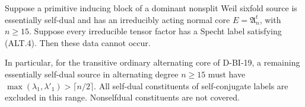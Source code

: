 \begin{theorem}
\label{HD-ALT-01c}
Suppose a primitive inducing block of a dominant nonsplit Weil
sixfold source is essentially self-dual and has an irreducibly
acting normal core $E=\mathfrak A_n^t$, with $n\ge15$.
Suppose every irreducible tensor factor has a Specht label
satisfying (ALT.4).  Then these data cannot occur.

In particular, for the transitive ordinary alternating core of
D-BI-19, a remaining essentially self-dual source in alternating
degree $n\ge15$ must have
$\max(\lambda_1,\lambda'_1)>\lceil n/2\rceil$.
All self-dual constituents of self-conjugate labels are excluded
in this range.  Nonselfdual constituents are not covered.
\end{theorem}

